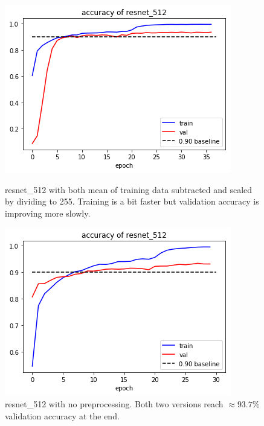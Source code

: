 \begin{figure}[!ht]
	\centering
	\begin{minipage}[t]{0.45\linewidth}
		\includegraphics[scale=0.5]{./figures/resnet512StMeanScale}
		\caption{resnet\_512 with both mean of training data subtracted and scaled by dividing to 255. Training is a bit faster but validation accuracy is improving more slowly.}
		\label{fig:resnet512StMeanScale}
	\end{minipage}
	\centering
	\begin{minipage}[t]{0.45\linewidth}
		\includegraphics[scale=0.5]{./figures/accResnet512}
		\caption{resnet\_512 with no preprocessing. Both two versions reach $\approx 93.7\%$ validation accuracy at the end.}
		\label{fig:accResnet512dup}
	\end{minipage}
\end{figure}


